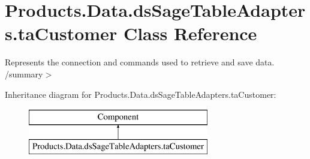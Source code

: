\hypertarget{class_products_1_1_data_1_1ds_sage_table_adapters_1_1ta_customer}{}\section{Products.\+Data.\+ds\+Sage\+Table\+Adapters.\+ta\+Customer Class Reference}
\label{class_products_1_1_data_1_1ds_sage_table_adapters_1_1ta_customer}


Represents the connection and commands used to retrieve and save data. /summary$>$  


Inheritance diagram for Products.\+Data.\+ds\+Sage\+Table\+Adapters.\+ta\+Customer\+:\begin{figure}[H]
\begin{center}
\leavevmode
\includegraphics[height=2.000000cm]{class_products_1_1_data_1_1ds_sage_table_adapters_1_1ta_customer}
\end{center}
\end{figure}
